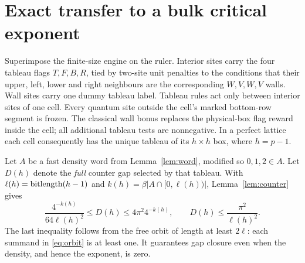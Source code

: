 \section{Exact transfer to a bulk critical exponent}\label{sec:transfer}
Superimpose the finite-size engine on the ruler. Interior sites carry
the four tableau flags $T,F,B,R$, tied by two-site unit penalties to the
conditions that their upper, left, lower and right neighbours are the
corresponding $W,V,W,V$ walls. Wall sites carry one dummy tableau label.
Tableau rules act only between interior sites of one cell. Every
quantum site outside the cell's marked bottom-row segment is frozen.
The classical wall bonus replaces the physical-box flag reward inside
the cell; all additional tableau tests are nonnegative. In a perfect
lattice each cell consequently has the unique tableau of its
$h\times h$ box, where $h=p-1$.

Let $A$ be a fast density word from Lemma~\ref{lem:word}, modified so
$0,1,2\in A$. Let $D(h)$ denote the \emph{full} counter gap selected by
that tableau. With $\ell(h)=\operatorname{bitlength}(h-1)$ and
$k(h)=\beta|A\cap[0,\ell(h))|$, Lemma~\ref{lem:counter} gives
\begin{equation}\label{eq:cell-bracket}
 \frac{4^{-k(h)}}{64\ell(h)^2}\leq D(h)
 \leq4\pi^2 4^{-k(h)},\qquad
 D(h)\leq\frac{\pi^2}{\ell(h)^2}.
\end{equation}
The last inequality follows from the free orbit of length at least
$2\ell$: each summand in \eqref{eq:orbit} is at least one. It guarantees
gap closure even when the density, and hence the exponent, is zero.

